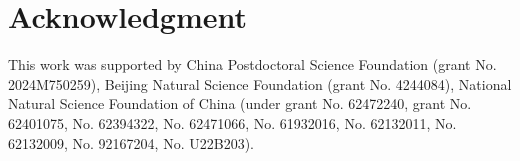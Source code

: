 \documentclass[conference]{IEEEtran}
\begin{document}





\section{Acknowledgment}

This work was supported by China Postdoctoral Science Foundation (grant No. 2024M750259), Beijing Natural Science Foundation (grant No. 4244084), National Natural Science Foundation of China (under grant No. 62472240, grant No. 62401075, No. 62394322, No. 62471066, No. 61932016, No. 62132011, No. 62132009, No. 92167204, No. U22B203).
\end{document}

